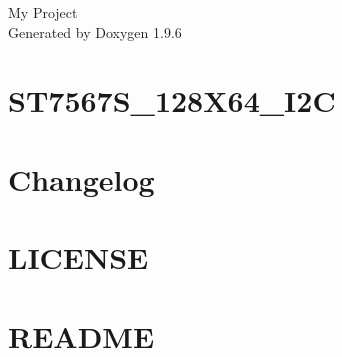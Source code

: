 \documentclass[twoside]{book}
\newcommand{\+}{\discretionary{\mbox{\scriptsize$\hookleftarrow$}}{}{}}
\newcommand{\clearemptydoublepage}{%
    \newpage{\pagestyle{empty}\cleardoublepage}%
  }
\begin{document}
  \raggedbottom
    \hypersetup{pageanchor=false,
                bookmarksnumbered=true,
                pdfencoding=unicode
               }
  \begin{titlepage}
  \vspace*{7cm}
  \begin{center}%
  {\Large My Project}\\
  \vspace*{1cm}
  {\large Generated by Doxygen 1.9.6}\\
  \end{center}
  \end{titlepage}
  \clearemptydoublepage
  \tableofcontents
  \clearemptydoublepage
  \hypersetup{pageanchor=true}
\chapter{ST7567\+S\+\_\+128\+X64\+\_\+\+I2C}
\label{md_extra__s_t7567_s_128_x64__i2_c__r_e_a_d_m_e}

\chapter{Changelog}
\label{md_extra__t_m1638plus_master__t_m1638plus_master_extra__c_h_a_n_g_e_l_o_g}

\chapter{LICENSE}
\label{md_extra__t_m1638plus_master__t_m1638plus_master__l_i_c_e_n_s_e}

\chapter{README}
\label{md_extra__t_m1638plus_master__t_m1638plus_master__r_e_a_d_m_e}

\end{document}
